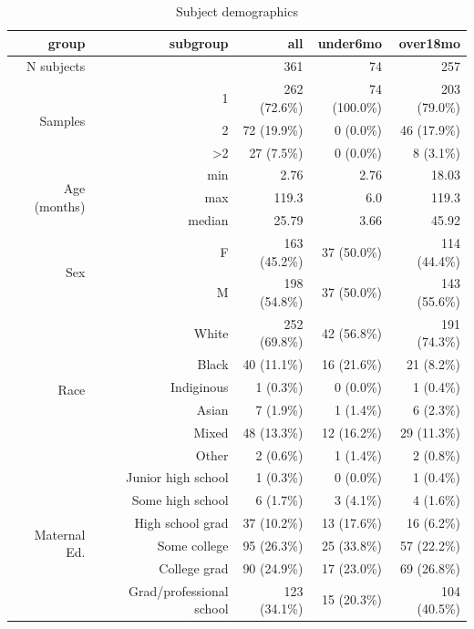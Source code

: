 \documentclass{article}
\begin{document}
\begin{table}[!htb]
    \centering
    \begin{tabular}{|r|r|r|r|r|}
      \hline\hline
      \textbf{group} & \textbf{subgroup} & \textbf{all} & \textbf{under6mo} & \textbf{over18mo} \\\hline
      N subjects &  & 361 & 74 & 257 \\  \hline
    \multirow{3}{*}{Samples} & 1 & 262 (72.6\%) & 74 (100.0\%) & 203 (79.0\%) \\ \cline{2-5}
         & 2 & 72 (19.9\%) & 0 (0.0\%) & 46 (17.9\%) \\ \cline{2-5}
         & \textgreater 2 & 27 (7.5\%) & 0 (0.0\%) & 8 (3.1\%) \\ \hline
    \multirow{3}{*}{Age (months)} & min & 2.76 & 2.76 & 18.03 \\ \cline{2-5}
         & max & 119.3 & 6.0 & 119.3 \\ \cline{2-5}
         & median & 25.79 & 3.66 & 45.92 \\ \hline
    \multirow{2}{*}{Sex} & F & 163 (45.2\%) & 37 (50.0\%) & 114 (44.4\%) \\   \cline{2-5}
                         & M & 198 (54.8\%) & 37 (50.0\%) & 143 (55.6\%) \\  \hline
    \multirow{6}{*}{Race} & White & 252 (69.8\%) & 42 (56.8\%) & 191 (74.3\%) \\   \cline{2-5}
        & Black & 40 (11.1\%) & 16 (21.6\%) & 21 (8.2\%) \\ \cline{2-5}
        & Indiginous & 1 (0.3\%) & 0 (0.0\%) & 1 (0.4\%) \\ \cline{2-5}
        & Asian & 7 (1.9\%) & 1 (1.4\%) & 6 (2.3\%) \\ \cline{2-5}
        & Mixed & 48 (13.3\%) & 12 (16.2\%) & 29 (11.3\%) \\ \cline{2-5}
        & Other & 2 (0.6\%) & 1 (1.4\%) & 2 (0.8\%) \\ \hline
    \multirow{6}{*}{Maternal Ed.} & Junior high school & 1 (0.3\%) & 0 (0.0\%) & 1 (0.4\%) \\   \cline{2-5}
        & Some high school & 6 (1.7\%) & 3 (4.1\%) & 4 (1.6\%) \\ \cline{2-5}
        & High school grad & 37 (10.2\%) & 13 (17.6\%) & 16 (6.2\%) \\ \cline{2-5}
        & Some college & 95 (26.3\%) & 25 (33.8\%) & 57 (22.2\%) \\ \cline{2-5}
        & College grad & 90 (24.9\%) & 17 (23.0\%) & 69 (26.8\%) \\ \cline{2-5}
        & Grad/professional school & 123 (34.1\%) & 15 (20.3\%) & 104 (40.5\%) \\\hline\hline
    \end{tabular}
    \caption{\label{tab:demo}Subject demographics}
\end{table}
\end{document}
